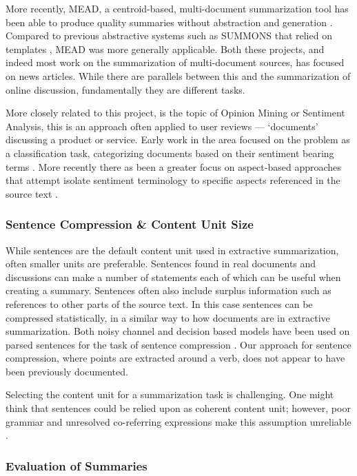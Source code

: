         More recently, MEAD, a centroid-based, multi-document summarization tool has been able to produce quality summaries without abstraction and generation \cite{radev2000centroid}. Compared to previous abstractive systems such as SUMMONS that relied on templates \cite{mckeown1995generating}, MEAD was more generally applicable. Both these projects, and indeed most work on the summarization of multi-document sources, has focused on news articles. While there are parallels between this and the summarization of online discussion, fundamentally they are different tasks.

        More closely related to this project, is the topic of Opinion Mining or Sentiment Analysis, this is an approach often applied to user reviews --- `documents' discussing a product or service. Early work in the area focused on the problem as a classification task, categorizing documents based on their sentiment bearing terms \cite{turney2002thumbs}. More recently there as been a greater focus on aspect-based approaches that attempt isolate sentiment terminology to specific aspects referenced in the source text \cite{hu2004mining}.

      \tocless\subsubsection{Sentence Compression \& Content Unit Size}

        While sentences are the default content unit used in extractive summarization, often smaller units are preferable. Sentences found in real documents and discussions can make a number of statements each of which can be useful when creating a summary. Sentences often also include surplus information such as references to other parts of the source text. In this case sentences can be compressed statistically, in a similar way to how documents are in extractive summarization. Both noisy channel and decision based models have been used on parsed sentences for the task of sentence compression \cite{knight2000statistics}. Our approach for sentence compression, where points are extracted around a verb, does not appear to have been previously documented.

        Selecting the content unit for a summarization task is challenging. One might think that sentences could be relied upon as coherent content unit; however, poor grammar and unresolved co-referring expressions make this assumption unreliable \cite{witbrock1999ultra}.

      \tocless\subsubsection{Evaluation of Summaries}

